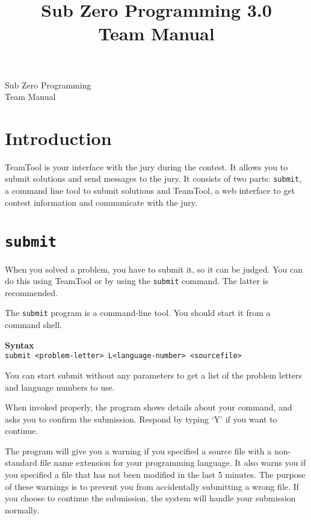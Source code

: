 \documentclass[a4paper,12pt]{article}
\title{ Sub Zero Programming 3.0 \\ Team Manual }
\newcommand{\cmd}[1]{\texttt{#1}}
\newcommand{\syntax}[1]{\textbf{Syntax}\\\cmd{#1}}
\begin{document}
\begin{titlepage}
\begin{center}

\vspace{2cm}
{\Huge Sub Zero Programming} \\
\vspace{1cm}
{\Huge Team Manual} \\
\vspace{5cm}


\end{center}
\end{titlepage}

\tableofcontents

\bigskip

\section{Introduction}

TeamTool is your interface with the jury during the contest. It allows you
to submit solutions and send messages to the jury. It consists of two parts:
\cmd{submit}, a command line tool to submit solutions and TeamTool, a web
interface to get contest information and communicate with the jury.

\section{\cmd{submit}}
\label{sec:submit}

When you solved a problem, you have to submit it, so it can be judged. You
can do this using TeamTool or by using the \cmd{submit} command. The latter
is recommended.

The \cmd{submit} program is a command-line tool. You should start it from a
command shell.

\syntax{submit <problem-letter> L<language-number> <sourcefile>}

You can start submit without any parameters to get a list of the problem
letters and language numbers to use.

When invoked properly, the program shows details about your command, and
asks you to confirm the submission. Respond by typing `Y' if you want to
continue.

The program will give you a warning if you specified a source file with a
non-standard file name extension for your programming language. It also
warns you if you specified a file that has not been modified in the last 5
minutes. The purpose of these warnings is to prevent you from accidentally
submitting a wrong file. If you choose to continue the submission, the
system will handle your submission normally.
\end{document}
